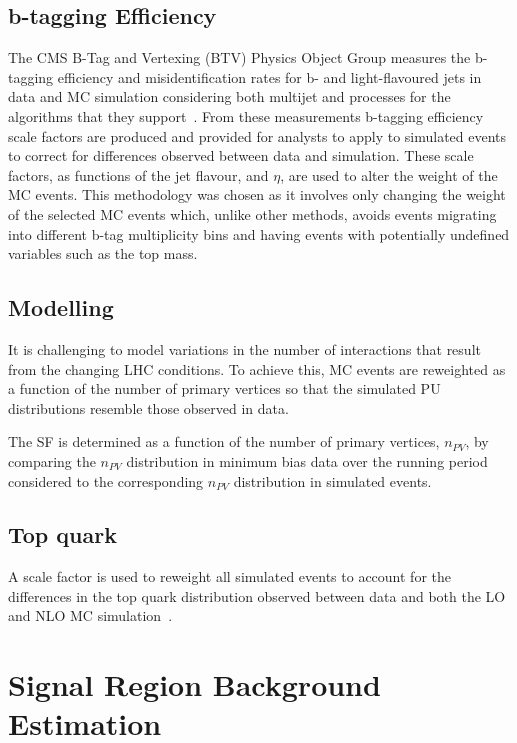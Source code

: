 \subsection{b-tagging Efficiency}\label{subsec:btagEff}
The CMS B-Tag and Vertexing (BTV) Physics Object Group measures the b-tagging efficiency and misidentification rates for b- and light-flavoured jets in data and MC simulation considering both multijet and \ttbar processes for the algorithms that they support~\cite{Sirunyan:2017ezt}.
From these measurements b-tagging efficiency scale factors are produced and provided for analysts to apply to simulated events to correct for differences observed between data and simulation.
These scale factors, as functions of the jet flavour, \pT and $\eta$, are used to alter the weight of the MC events.
This methodology was chosen as it involves only changing the weight of the selected MC events which, unlike other methods, avoids events migrating into different b-tag multiplicity bins and having events with potentially undefined variables such as the top mass.

\subsection{\PU Modelling}\label{subsec:puSF}
It is challenging to model variations in the number of \PU interactions that result from the changing LHC conditions.
To achieve this, MC events are reweighted as a function of the number of primary vertices so that the simulated PU distributions resemble those observed in data.

The \PU SF is determined as a function of the number of primary vertices, $n_{PV}$, by comparing the $n_{PV}$ distribution in minimum bias data over the running period considered to the corresponding $n_{PV}$ distribution in simulated events.

\subsection{Top quark \pt}
A scale factor is used to reweight all simulated \ttbar events to account for the differences in the top quark \pt distribution observed between data and both the LO and NLO MC simulation~\cite{Khachatryan:2015oqa}.

\section{Signal Region Background Estimation}\label{sec:simBackgrounds}

